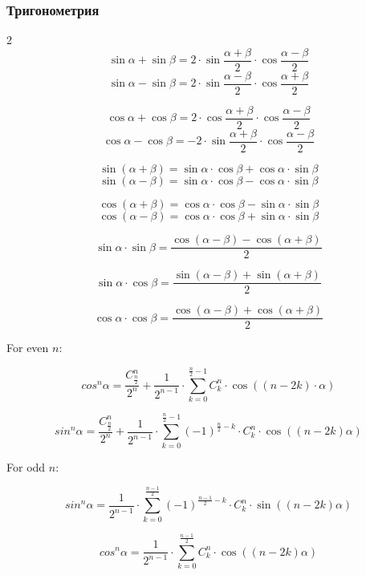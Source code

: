 \subsubsection{Тригонометрия}
\begin{minipage}{0.48\textwidth}
	\begin{multicols}{2}
		$$\sin{\alpha} + \sin{\beta} = 2 \cdot \sin{\frac{\alpha + \beta}{2}} \cdot \cos{\frac{\alpha - \beta}{2}}$$
		$$\sin{\alpha} - \sin{\beta} = 2 \cdot \sin{\frac{\alpha - \beta}{2}} \cdot \cos{\frac{\alpha + \beta}{2}}$$

		$$\cos{\alpha} + \cos{\beta} = 2 \cdot \cos{\frac{\alpha + \beta}{2}} \cdot \cos{\frac{\alpha - \beta}{2}}$$
		$$\cos{\alpha} - \cos{\beta} = - 2 \cdot \sin{\frac{\alpha + \beta}{2}} \cdot \cos{\frac{\alpha - \beta}{2}}$$

		$$\sin{(\alpha + \beta)} = \sin{\alpha} \cdot \cos{\beta} + \cos{\alpha} \cdot \sin{\beta}$$
		$$\sin{(\alpha - \beta)} = \sin{\alpha} \cdot \cos{\beta} - \cos{\alpha} \cdot \sin{\beta}$$

		$$\cos{(\alpha + \beta)} = \cos{\alpha} \cdot \cos{\beta} - \sin{\alpha} \cdot \sin{\beta}$$
		$$\cos{(\alpha - \beta)} = \cos{\alpha} \cdot \cos{\beta} + \sin{\alpha} \cdot \sin{\beta}$$
	
		$$\sin{\alpha} \cdot \sin{\beta} = \frac{\cos{(\alpha - \beta)} - \cos{(\alpha + \beta)}}{2}$$

		$$\sin{\alpha} \cdot \cos{\beta} = \frac{\sin{(\alpha - \beta)} + \sin{(\alpha + \beta)}}{2}$$

		$$\cos{\alpha} \cdot \cos{\beta} = \frac{\cos{(\alpha - \beta)} + \cos{(\alpha + \beta)}}{2}$$
	\end{multicols}
\end{minipage}
\newline
\newline

For even $n$:

$$cos^n \alpha=\frac {C_\frac n 2^n}{2^n}+\frac1{2^{n-1}} \cdot \sum_{k=0}^{\frac{n}{2} - 1} C_k^n \cdot \cos{((n-2k) \cdot \alpha)}$$

$$sin^n \alpha=\frac {C_\frac n 2^n}{2^n}+\frac1{2^{n-1}} \cdot \sum_{k=0}^{\frac{n}{2} -1} (-1)^{\frac n 2 -k} \cdot C_k^n \cdot \cos{((n-2k) \alpha)}$$

For odd $n$:

$$sin^n \alpha = \frac1{2^{n-1}} \cdot \sum_{k=0}^{\frac{n-1}{2}} (-1)^{\frac {n-1} 2 -k} \cdot C_k^n \cdot \sin{((n-2k) \alpha)}$$

$$cos^n \alpha = \frac1{2^{n-1}} \cdot \sum_{k=0}^{\frac{n-1}{2}} C_k^n \cdot \cos{((n-2k) \alpha)}$$


